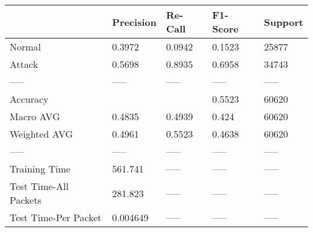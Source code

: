 \begin{tabular}{lllll}
\toprule
{} & Precision & Re-Call & F1-Score & Support \\
\midrule
Normal                &    0.3972 &  0.0942 &   0.1523 &   25877 \\
Attack                &    0.5698 &  0.8935 &   0.6958 &   34743 \\
-----                 &     ----- &   ----- &    ----- &   ----- \\
Accuracy              &           &         &   0.5523 &   60620 \\
Macro AVG             &    0.4835 &  0.4939 &    0.424 &   60620 \\
Weighted AVG          &    0.4961 &  0.5523 &   0.4638 &   60620 \\
-----                 &     ----- &   ----- &    ----- &   ----- \\
Training Time         &   561.741 &   ----- &    ----- &   ----- \\
Test Time-All Packets &   281.823 &   ----- &    ----- &   ----- \\
Test Time-Per Packet  &  0.004649 &   ----- &    ----- &   ----- \\
\bottomrule
\end{tabular}
